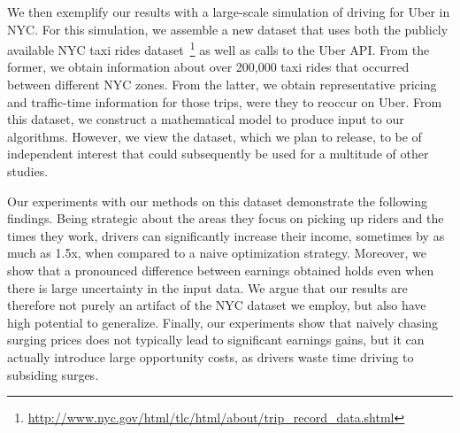 We then exemplify our  results with a large-scale simulation of driving for Uber in NYC. 
For this simulation, we assemble a new dataset that uses both the publicly available NYC taxi rides 
dataset~\footnote{\url{http://www.nyc.gov/html/tlc/html/about/trip_record_data.shtml}} as well as calls to the Uber API.
From the former, we obtain information about over 200,000 taxi rides that occurred between different NYC zones. 
From the latter, we obtain representative pricing and traffic-time information for those trips, were they to reoccur on Uber.
From this dataset, we construct a mathematical model to produce input to our algorithms. 
However, we view the dataset, which we plan to release, to be of independent interest that could subsequently 
be used for a multitude of other studies.

Our experiments with our methods on this dataset demonstrate the following findings.
Being strategic about the areas they focus on picking up riders and the times they work, 
drivers can significantly increase their income, sometimes by
as much as 1.5x, when compared to a naive optimization strategy.
Moreover, we show that a pronounced difference between earnings obtained 
holds even when there is large uncertainty in the input data. 
We argue that our results are therefore not purely an artifact of the NYC dataset we employ, 
  but also have high potential to generalize.
Finally, our experiments show that naively chasing surging prices does not typically lead 
  to significant earnings gains, but it can actually introduce large opportunity costs, as drivers
  waste time driving to subsiding surges. 
